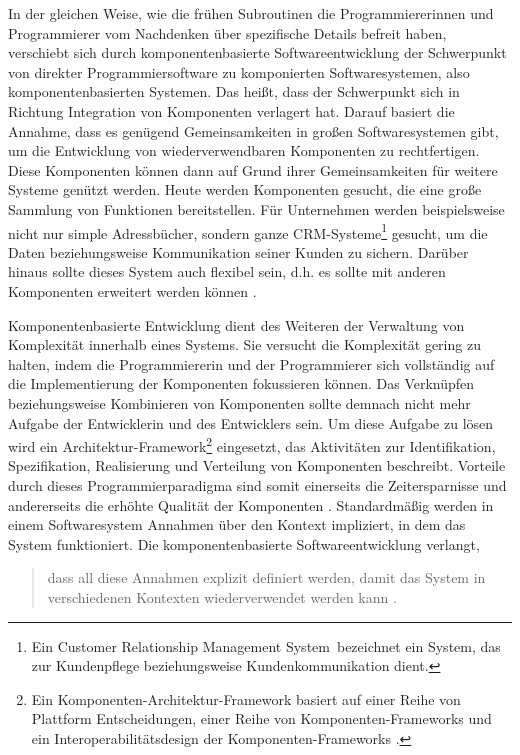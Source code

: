 %
In der gleichen Weise, wie die frühen Subroutinen die Programmiererinnen und Programmierer vom Nachdenken über spezifische Details befreit haben, verschiebt sich durch komponentenbasierte Softwareentwicklung der Schwerpunkt von direkter Programmiersoftware zu komponierten Softwaresystemen, also komponentenbasierten Systemen. Das heißt, dass der Schwerpunkt sich in Richtung Integration von Komponenten verlagert hat. Darauf basiert die Annahme, dass es genügend Gemeinsamkeiten in  großen Softwaresystemen gibt, um die Entwicklung von wiederverwendbaren Komponenten zu rechtfertigen. Diese Komponenten können dann auf Grund ihrer Gemeinsamkeiten für weitere Systeme genützt werden. Heute werden Komponenten gesucht, die eine große Sammlung von Funktionen bereitstellen. Für Unternehmen werden beispielsweise nicht nur simple Adressbücher, sondern ganze CRM-Systeme\footnote{Ein \glqq Customer Relationship Management System\grqq\ bezeichnet ein System, das zur Kundenpflege beziehungsweise Kundenkommunikation dient.} gesucht, um die Daten beziehungsweise Kommunikation seiner Kunden zu sichern. Darüber hinaus sollte dieses System auch flexibel sein, d.h. es sollte mit anderen Komponenten erweitert werden können \citereset \autocite[siehe][S. 17-25]{Andresen.2003}.

Komponentenbasierte Entwicklung dient des Weiteren der Verwaltung von Komplexität innerhalb eines Systems. Sie versucht die Komplexität gering zu halten, indem die Programmiererin und der Programmierer sich vollständig auf die Implementierung der Komponenten fokussieren können. Das Verknüpfen beziehungsweise Kombinieren von Komponenten sollte demnach nicht mehr Aufgabe der Entwicklerin und des Entwicklers sein. Um diese Aufgabe zu lösen wird ein Architektur-Framework\footnote{Ein Komponenten-Architektur-Framework basiert auf einer Reihe von Plattform Entscheidungen, einer Reihe von Komponenten-Frameworks und ein Interoperabilitätsdesign der Komponenten-Frameworks \citereset \autocite[siehe][419-422]{Szyperski.2002}.} eingesetzt, das Aktivitäten zur Identifikation, Spezifikation, Realisierung und Verteilung von Komponenten beschreibt. Vorteile durch dieses Programmierparadigma sind somit einerseits die Zeitersparnisse und andererseits die erhöhte Qualität der Komponenten \citereset \autocite[siehe][S. 1-3]{Andresen.2003}. Standardmäßig werden in einem Softwaresystem Annahmen über den Kontext impliziert, in dem das System funktioniert. Die komponentenbasierte Softwareentwicklung verlangt,
\begin{quote}
  \glqq dass all diese Annahmen explizit definiert werden, damit das System in verschiedenen Kontexten wiederverwendet werden kann \citereset \autocite[siehe][]{Andresen.2003}.\grqq
\end{quote}

